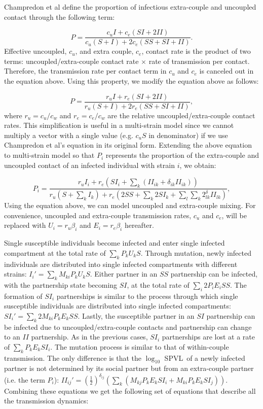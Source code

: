 \documentclass[10pt,letterpaper]{article}
\newcommand{\Lspvl}{$\log_{10}$ SPVL}
\begin{document}
Champredon et al define the proportion of infectious extra-couple and uncoupled contact through the following term:

\begin{equation}
P = \frac{c_u I + c_e (SI + 2 II)}{c_u (S + I) + 2 c_e(SS + SI + II)}.
\end{equation}
Effective uncoupled, $c_u$, and extra couple, $c_e$, contact rate is the product of two terms: uncoupled/extra-couple contact rate $\times$ rate of transmission per contact. Therefore, the transmission rate per contact term in $c_u$ and $c_e$ is canceled out in the equation above. Using this property, we modify the equation above as follows:

\begin{equation}
P = \frac{r_u I + r_e (SI + 2 II)}{r_u (S + I) + 2 r_e(SS + SI + II)},
\end{equation}
where $r_u = c_u/c_w$ and $r_e = c_e/c_w$ are the relative uncoupled/extra-couple contact rates. This simplification is useful in a multi-strain model since we cannot multiply a vector with a single value (e.g. $c_u S$ in denominator) if we use Champredon et al's equation in its original form. Extending the above equation to multi-strain model so that $P_i$ represents the proportion of the extra-couple and uncoupled contact of an infected individual with strain $i$, we obtain:

\begin{equation}
P_i = \frac{r_u I_i + r_e (SI_i + \sum_k (II_{ik} + \delta_{ik} II_{ik}))}{r_u (S + \sum_k I_k) + r_e(2 SS + \sum_k 2 SI_k + \sum_l \sum_k 2^\delta_{lk} II_{lk} )},
\end{equation}
Using the equation above, we can model uncoupled and extra-couple mixing. For convenience, uncoupled and extra-couple transmission rates, $c_u$ and $c_e$, will be replaced with $U_i = r_u \beta_i$ and $E_i = r_e \beta_i$ hereafter.

Single susceptible individuals become infected and enter single infected compartment at the total rate of $\sum_k P_k U_k S$. Through mutation, newly infected individuals are distributed into single infected compartments with different strains: $I_i' = \sum_k M_{ki} P_k U_k S$. Either partner in an $SS$ partnership can be infected, with the partnership state becoming $SI$, at the total rate of $\sum_i 2 P_i E_i SS$. The formation of $SI_i$ partnerships is similar to the process through which single susceptible individuals are distributed into single infected compartments: $SI_i' = \sum_k 2 M_{ki} P_k E_k SS$. Lastly, the susceptible partner in an $SI$ partnership can be infected due to uncoupled/extra-couple contacts and partnership can change to an $II$ partnership. As in the previous cases, $SI_i$ partnerships are lost at a rate of $\sum_k P_k E_k SI_i$. The mutation process is similar to that of within-couple transmission. The only difference is that the \Lspvl\ of a newly infected partner is not determined by its social partner but from an extra-couple partner (i.e. the term $P_i$): $II_{ij}' = (\frac{1}{2})^{\delta_{ij}}(\sum_k (M_{kj} P_k E_k SI_i + M_{ki} P_k E_k SI_j))$. Combining these equations we get the following set of equations that describe all the transmission dynamics:
\end{document}
